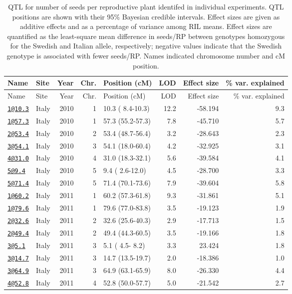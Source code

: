 \documentclass[
]{article}
\begin{document}
\begin{longtable}[]{@{}llrrlrrr@{}}
\caption{\label{tab:individual-tofu-qtl}QTL for number of seeds per reproductive plant identifed in individual experiments. QTL positions are shown with their 95\% Bayesian credible intervals. Effect sizes are given as additive effects and as a percentage of variance among RIL means. Effect sizes are quantified as the least-square mean difference in seeds/RP between genotypes homozygous for the Swedish and Italian allele, respectively; negative values indicate that the Swedish genotype is associated with fewer seeds/RP. Names indicated chromosome number and cM position.}\tabularnewline
\toprule
Name & Site & Year & Chr. & Position (cM) & LOD & Effect size & \% var. explained\tabularnewline
\midrule
\endfirsthead
\toprule
Name & Site & Year & Chr. & Position (cM) & LOD & Effect size & \% var. explained\tabularnewline
\midrule
\endhead
\href{mailto:1@10.3}{\nolinkurl{1@10.3}} & Italy & 2010 & 1 & 10.3 ( 8.4-10.3) & 12.2 & -58.194 & 9.3\tabularnewline
\href{mailto:1@57.3}{\nolinkurl{1@57.3}} & Italy & 2010 & 1 & 57.3 (55.2-57.3) & 7.8 & -45.710 & 5.7\tabularnewline
\href{mailto:2@53.4}{\nolinkurl{2@53.4}} & Italy & 2010 & 2 & 53.4 (48.7-56.4) & 3.2 & -28.643 & 2.3\tabularnewline
\href{mailto:3@54.1}{\nolinkurl{3@54.1}} & Italy & 2010 & 3 & 54.1 (18.0-60.4) & 4.2 & -32.925 & 3.1\tabularnewline
\href{mailto:4@31.0}{\nolinkurl{4@31.0}} & Italy & 2010 & 4 & 31.0 (18.3-32.1) & 5.6 & -39.584 & 4.1\tabularnewline
\href{mailto:5@9.4}{\nolinkurl{5@9.4}} & Italy & 2010 & 5 & 9.4 ( 2.6-12.0) & 4.5 & -28.700 & 3.3\tabularnewline
\href{mailto:5@71.4}{\nolinkurl{5@71.4}} & Italy & 2010 & 5 & 71.4 (70.1-73.6) & 7.9 & -39.604 & 5.8\tabularnewline
\href{mailto:1@60.2}{\nolinkurl{1@60.2}} & Italy & 2011 & 1 & 60.2 (57.3-61.8) & 9.3 & -31.861 & 5.1\tabularnewline
\href{mailto:1@79.6}{\nolinkurl{1@79.6}} & Italy & 2011 & 1 & 79.6 (77.0-83.8) & 3.5 & -19.123 & 1.9\tabularnewline
\href{mailto:2@32.6}{\nolinkurl{2@32.6}} & Italy & 2011 & 2 & 32.6 (25.6-40.3) & 2.9 & -17.713 & 1.5\tabularnewline
\href{mailto:2@49.4}{\nolinkurl{2@49.4}} & Italy & 2011 & 2 & 49.4 (44.3-60.5) & 3.5 & -19.166 & 1.8\tabularnewline
\href{mailto:3@5.1}{\nolinkurl{3@5.1}} & Italy & 2011 & 3 & 5.1 ( 4.5- 8.2) & 3.3 & 23.424 & 1.8\tabularnewline
\href{mailto:3@14.7}{\nolinkurl{3@14.7}} & Italy & 2011 & 3 & 14.7 (13.5-19.7) & 2.0 & -18.386 & 1.0\tabularnewline
\href{mailto:3@64.9}{\nolinkurl{3@64.9}} & Italy & 2011 & 3 & 64.9 (63.1-65.9) & 8.0 & -26.330 & 4.4\tabularnewline
\href{mailto:4@52.8}{\nolinkurl{4@52.8}} & Italy & 2011 & 4 & 52.8 (50.0-57.7) & 5.0 & -21.542 & 2.7\tabularnewline

\end{longtable}
\end{document}
